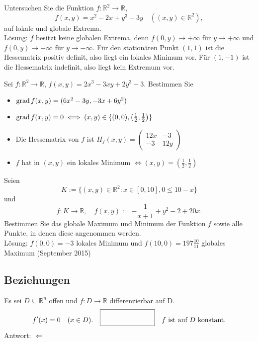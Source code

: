 Untersuchen Sie die Funktion $f : \mathbb{R}^2 \to \mathbb{R}$,
\begin{displaymath}
  f(x,y) = x^2 - 2x + y^3 - 3y \quad ((x,y) \in \mathbb{R}^2),
\end{displaymath}
auf lokale und globale Extrema.\\
Lösung:
$f$ besitzt keine globalen Extrema, denn $f(0,y) \to +\infty$ für $y \to +\infty$ und $f(0,y) \to -\infty$ für $y \to -\infty$.
Für den stationären Punkt $(1,1)$ ist die Hessematrix positiv definit, also liegt ein lokales Minimum vor.
Für $(1,-1)$ ist die Hessematrix indefinit, also liegt kein Extremum vor.

Sei $f : \mathbb{R}^2 \to \mathbb{R}$, $f(x,y) = 2x^3 - 3xy + 2y^3 - 3$.
Bestimmen Sie
\begin{itemize}
    \item $\operatorname{grad} f(x,y) = (6x^2 - 3y, -3x + 6y^2)$
    \item $\operatorname{grad} f(x,y) = 0 \iff (x,y) \in \{(0,0), \left(\frac{1}{2}, \frac{1}{2}\right)\}$
    \item Die Hessematrix von $f$ ist $H_f(x,y) = \begin{pmatrix} 12x & -3\\-3 & 12y\end{pmatrix}$
    \item $f$ hat in $(x,y)$ ein lokales Minimum $\iff (x,y) = \left(\frac{1}{2}, \frac{1}{2}\right)$
\end{itemize}

Seien
\begin{displaymath}
  K := \{(x,y) \in \mathbb{R}^2 : x\in [0,10], 0 \leq 10 - x\}
\end{displaymath}
und
\begin{displaymath}
  f : K \to \mathbb{R}, \quad f(x,y) := - \frac{1}{x + 1} + y^2 - 2 + 20x.
\end{displaymath}
Bestimmen Sie das globale Maximum und Minimum der Funktion $f$ sowie alle Punkte, in denen diese angenommen werden.\\
Lösung:
$f(0,0) = -3$ lokales Minimum und $f(10,0) = 197 \frac{10}{11}$ globales Maximum
(September 2015)

\subsection{Beziehungen}
Es sei $D \subseteq \mathbb{R}^n$ offen und $f : D \to \mathbb{R}$ differenzierbar auf D.
\begin{displaymath}
  f'(x) = 0 \quad (x \in D). \quad \fbox{\rule{1in}{0pt}\rule[-0.5ex]{0pt}{4ex}} \quad f \text{ ist auf } D \text{ konstant}.
\end{displaymath}
Antwort: $\Leftarrow$

